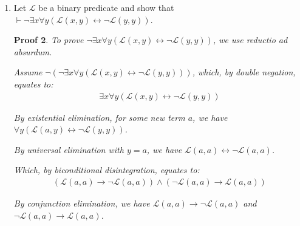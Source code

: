 \documentclass[12pt]{article}
\theoremstyle{proofstyle}
\newtheorem*{proof*}{Proof}
\let\oldquote\quote
\let\oldendquote\endquote
\renewenvironment{quote}
    {\oldquote\setlength{\parskip}{0.2em}}
    {\oldendquote}
\begin{document}
\begin{enumerate}[left=0pt, itemsep=2em, parsep=1em]
\begin{enumerate}[label=(\alph*), itemsep=1.5em, leftmargin=2em]
\begin{proof*}
    For clarity, let $K = \text{Kusanagi}$.
    
    By universal elimination on $\forall x(\neg\gamma(x) \to \alpha(x))$ with $x = K$, we have \\ $\neg\gamma(K) \to \alpha(K)$.
    
    By the assumption $\neg\alpha(K)$ and $\neg\gamma(K) \to \alpha(K)$, we have $\neg(\neg\gamma(K))$ by modus tollens.
    \begin{align*}
        \neg(\neg\gamma(K)) &\equiv \gamma(K) && \text{(By Double Negation)}
    \end{align*}
    
    Thus we have $\gamma(K)$.
    
    By existential introduction on $\gamma(K)$, we have $\exists x(\gamma(x))$.
    
    Therefore, $\exists x(\gamma(x))$ holds. \qed
\end{proof*}
\newpage
\item Let $\mathcal{L}$ be a binary predicate and show that $\vdash \neg\exists x\forall y(\mathcal{L}(x, y) \leftrightarrow \neg\mathcal{L}(y, y))$.

\begin{proof*} To prove $\neg\exists x\forall y(\mathcal{L}(x, y) \leftrightarrow \neg\mathcal{L}(y, y))$, we use reductio ad absurdum. 
    
    \begin{quote}
    Assume $\neg(\neg\exists x\forall y(\mathcal{L}(x, y) \leftrightarrow \neg\mathcal{L}(y, y)))$, which, by double negation, equates to:
    \begin{align*}
        \exists x\forall y(\mathcal{L}(x, y) \leftrightarrow \neg\mathcal{L}(y, y))
    \end{align*}
    
    By existential elimination, for some new term $a$, we have \\ $\forall y(\mathcal{L}(a, y) \leftrightarrow \neg\mathcal{L}(y, y))$.
    
    By universal elimination with $y = a$, we have $\mathcal{L}(a, a) \leftrightarrow \neg\mathcal{L}(a, a)$.
    
    Which, by biconditional disintegration, equates to:
    \begin{align*}
        (\mathcal{L}(a,a) \to \neg\mathcal{L}(a,a)) \wedge (\neg\mathcal{L}(a,a) \to \mathcal{L}(a,a))
    \end{align*}
    
    By conjunction elimination, we have $\mathcal{L}(a,a) \to \neg\mathcal{L}(a,a)$ and \\$\neg\mathcal{L}(a,a) \to \mathcal{L}(a,a)$.


\end{quote}
\end{proof*}
\end{enumerate}
\end{enumerate}
\end{document}
